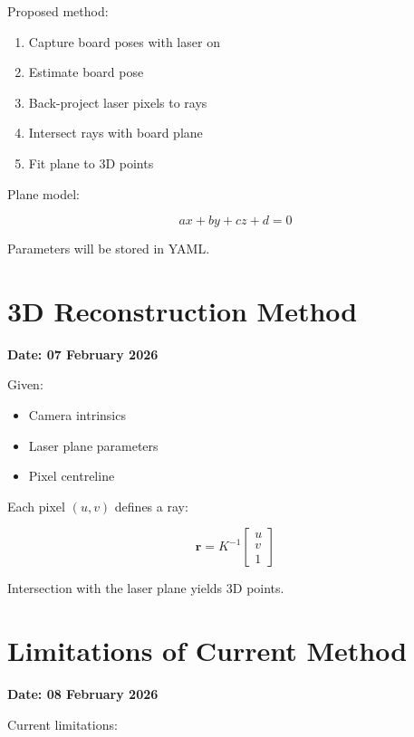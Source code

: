 \documentclass[11pt,a4paper]{article}
\begin{document}
Proposed method:

\begin{enumerate}
  \item Capture board poses with laser on
  \item Estimate board pose
  \item Back-project laser pixels to rays
  \item Intersect rays with board plane
  \item Fit plane to 3D points
\end{enumerate}

Plane model:

\begin{equation}
ax + by + cz + d = 0
\end{equation}

Parameters will be stored in YAML.

\section{3D Reconstruction Method}

\textbf{Date: 07 February 2026}

Given:

\begin{itemize}
  \item Camera intrinsics
  \item Laser plane parameters
  \item Pixel centreline
\end{itemize}

Each pixel $(u,v)$ defines a ray:

\begin{equation}
\mathbf{r} = K^{-1}
\begin{bmatrix}
u \\ v \\ 1
\end{bmatrix}
\end{equation}

Intersection with the laser plane yields 3D points.

\section{Limitations of Current Method}

\textbf{Date: 08 February 2026}

Current limitations:
\end{document}
